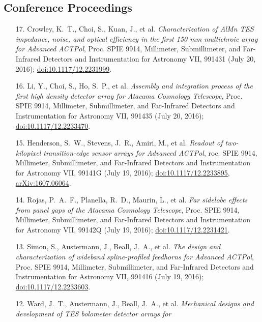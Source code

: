 \documentclass[margin,line]{res}
\begin{document}
\begin{resume}
\section{\sc Conference Proceedings} 
\begin{enumerate}

\item[{17.}] Crowley, K.~T., Choi, S., Kuan, J., et al.
    \textit{Characterization of AlMn TES impedance, noise, and optical efficiency
    in the first 150 mm multichroic array for Advanced ACTPol}, Proc. SPIE 9914,
    Millimeter, Submillimeter, and Far-Infrared Detectors and Instrumentation for
    Astronomy VII, 991431 (July 20, 2016);
    \href{http://dx.doi.org/10.1117/12.2231999}{doi:10.1117/12.2231999}.
\item[{16.}] Li, Y., Choi, S., Ho, S.~P., et al. \textit{Assembly and
    integration process of the first high density detector array for Atacama
    Cosmology Telescope}, Proc. SPIE 9914, Millimeter, Submillimeter, and
    Far-Infrared Detectors and Instrumentation for Astronomy VII, 991435 (July 20,
    2016); \href{http://dx.doi.org/10.1117/12.2233470}{doi:10.1117/12.2233470}.
\item[{15.}] Henderson, S.~W., Stevens, J.~R., Amiri, M., et al.
    \textit{Readout of two-kilopixel transition-edge sensor arrays for Advanced
    ACTPol}, roc. SPIE 9914, Millimeter, Submillimeter, and Far-Infrared Detectors
    and Instrumentation for Astronomy VII, 99141G (July 19, 2016);
    \href{http://dx.doi.org/10.1117/12.2233895}{doi:10.1117/12.2233895},
    \href{http://arxiv.org/abs/1607.06064}{arXiv:1607.06064}.
\item[{14.}] Rojas, P.~A.~F., Planella, R.~D., Maurin, L., et al. \textit{Far
    sidelobe effects from panel gaps of the Atacama Cosmology Telescope}, Proc.
    SPIE 9914, Millimeter, Submillimeter, and Far-Infrared Detectors and
    Instrumentation for Astronomy VII, 99142Q (July 19, 2016);
    \href{http://dx.doi.org/10.1117/12.2231421}{doi:10.1117/12.2231421}.
\item[{13.}] Simon, S., Austermann, J., Beall, J.~A., et al. \textit{The design
    and characterization of wideband spline-profiled feedhorns for Advanced
    ACTPol}, Proc. SPIE 9914, Millimeter, Submillimeter, and Far-Infrared Detectors
    and Instrumentation for Astronomy VII, 991416 (July 19, 2016);
    \href{http://dx.doi.org/10.1117/12.2233603}{doi:10.1117/12.2233603}.
\item[{12.}] Ward, J.~T., Austermann, J., Beall, J.~A., et al.
    \textit{Mechanical designs and development of TES bolometer detector arrays for
}
\end{enumerate}
\end{resume}
\end{document}
